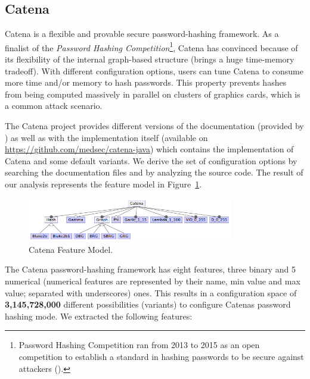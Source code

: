 \subsection{Catena}

Catena is a flexible and provable secure password-hashing framework. As a finalist of the \textit{Password Hashing Competition}\footnote{Password Hashing Competition ran from 2013 to 2015 as an open competition to establish a standard in hashing passwords to be secure against attackers (\cite{phc2015}).}, Catena has convinced because of its flexibility of the internal graph-based structure (brings a huge time-memory tradeoff). With different configuration options, users can tune Catena to consume more time and/or memory to hash passwords. This property prevents hashes from being computed massively in parallel on clusters of graphics cards, which is a common attack scenario. 

The Catena project provides different versions of the documentation (provided by \cite{catena2014medsec}) as well as with the implementation itself (available on \url{https://github.com/medsec/catena-java}) which contains the implementation of Catena and some default variants. We derive the set of configuration options by searching the documentation files and by analyzing the source code. The result of our analysis represents the feature model in Figure~\ref{fm_catena}.

\begin{figure}
  \centering
  \includegraphics[width=0.8\textwidth]{images/Catena_Feature_model}
  \caption{Catena Feature Model.}
  \label{fm_catena}
\end{figure}

The Catena password-hashing framework has eight features, three binary and 5 numerical (numerical features are represented by their name, min value and max value; separated with underscores) ones. This results in a configuration space of \textbf{3,145,728,000} different possibilities (variants) to configure Catenas password hashing mode. We extracted the following features:


